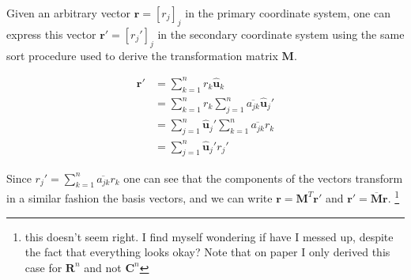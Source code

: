 \documentclass{article}      %
\newcommand{\norm}[1]{\lVert#1\rVert}
\newcommand{\Bu}[0]{\mathbf{u}}
\newcommand{\Br}[0]{\mathbf{r}}
\newcommand{\BF}[0]{\mathbf{F}}
\newcommand{\BM}[0]{\mathbf{M}}
\newcommand{\Bl}[0]{\mathbf{l}}
\newcommand{\Cn}[0]{\mathbf{C}^n}
\newcommand{\Rn}[0]{\mathbf{R}^n}
\newcommand{\Btheta}[0]{\boldsymbol{\theta}}
\newcommand{\rcap}[0]{\hat{\Br}}
\newcommand{\ucap}[1]{\hat{\Bu}_{#1}}
\newcommand{\thetacap}[0]{\hat{\Btheta}}
\begin{document}
Given an arbitrary vector $\Br = [r_j]_j$ in the primary coordinate system, one 
can express this vector $\Br' = [r_j']_j$ in the secondary coordinate system using 
the same sort procedure used to derive the transformation matrix $\BM$.

\begin{align}
\Br' &= 
      \sum_{k=1}^n
      {
       r_k 
       \ucap{k} 
      } \\
      &= 
      \sum_{k=1}^n
      {
       r_k
\sum_{j=1}^n
{
\overline{a_{jk}}
\ucap{j}'
}
      } \\
      &= 
\sum_{j=1}^n
      {
\ucap{j}'
      \sum_{k=1}^n
{
\overline{a_{jk}}
       r_k
}
      } \\
      &=
\sum_{j=1}^n
      {
\ucap{j}'
r_j'
      }
\end{align}

Since $r_j' = 
      \sum_{k=1}^n
{
\overline{a_{jk}}
       r_k
}
$
one can see that the components of the vectors transform 
in a similar fashion the 
basis vectors, and we can write $\Br = \BM^T \Br'$ and $\Br' = \overline{\BM} \Br$.
\footnote{this doesn't seem right.  I find myself wondering if have I messed up, despite the fact that everything looks okay?  Note that on paper I only derived this case for $\Rn$ and not $\Cn$}

%
%
\end{document}
